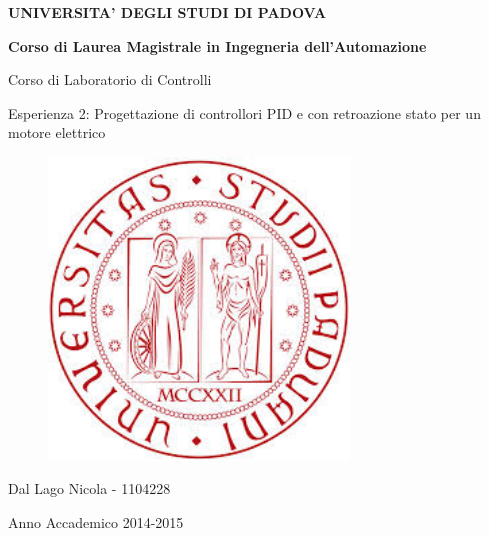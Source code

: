 \documentclass[english]{article}
\begin{document}
\begin{titlepage} 

\begin{center}
\begin{Large} \textbf{UNIVERSITA' DEGLI STUDI DI PADOVA} \\
 \end{Large} \vspace{1cm}
 \begin{Large} \textbf{Corso di Laurea Magistrale in Ingegneria dell'Automazione}\\
 \end{Large} \vspace{2cm}
\begin{Large} Corso di Laboratorio di Controlli \end{Large}
\par\end{center}

\begin{center}
\begin{Large}Esperienza 2: Progettazione di controllori PID e con retroazione stato per un motore elettrico\\
 \end{Large}
\par\end{center}

\begin{center}
\vspace{2cm}
\begin{figure}[!htb]
\centering \includegraphics[width=8cm]{./figure/unipd}\\
 
\end{figure}

\par\end{center}

\begin{center}
 \vspace{2cm}
 \begin{Large} Dal Lago Nicola - 1104228 \\
 \end{Large} \vspace{2cm}
 \begin{Large} Anno Accademico 2014-2015 \end{Large} 
\par\end{center}

\end{titlepage}
\end{document}
